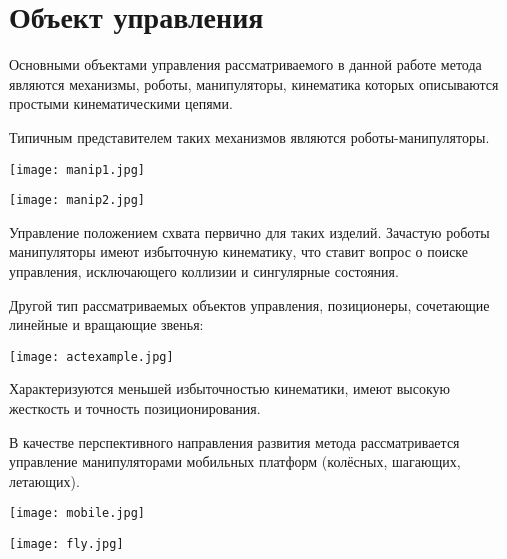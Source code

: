 \section{Объект управления}

Основными объектами управления рассматриваемого в данной работе метода являются механизмы, роботы, манипуляторы, кинематика которых описываются простыми кинематическими цепями.

Типичным представителем таких механизмов являются роботы-манипуляторы.

\begin{center}
  \texttt{[image: manip1.jpg]}
  \label{}
\end{center}

\begin{center}
  \texttt{[image: manip2.jpg]}
  \label{}
\end{center}

Управление положением схвата первично для таких изделий. Зачастую роботы манипуляторы имеют избыточную кинематику, что ставит вопрос о поиске управления, исключающего коллизии и сингулярные состояния.

Другой тип рассматриваемых объектов управления, позиционеры, сочетающие линейные и вращающие звенья:

\begin{center}
  \texttt{[image: actexample.jpg]}
  \label{}
\end{center}

Характеризуются меньшей избыточностью кинематики, имеют высокую жесткость и точность позиционирования.

В качестве перспективного направления развития метода рассматривается управление манипуляторами мобильных платформ (колёсных, шагающих, летающих).

\begin{center}
  \texttt{[image: mobile.jpg]}
  \label{}
\end{center}

\begin{center}
  \texttt{[image: fly.jpg]}
  \label{}
\end{center}

